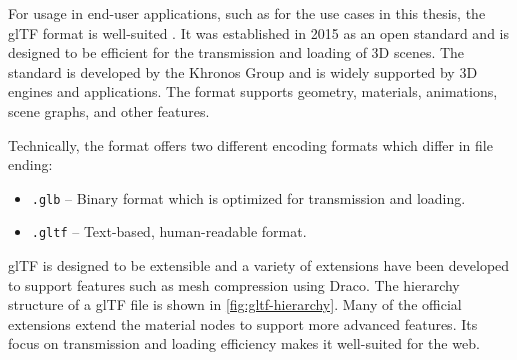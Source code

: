 For usage in end-user applications, such as for the use cases in this thesis, the \gls{glTF} format is well-suited \cite{gltfSpecification}. It was established in 2015 as an open standard and is designed to be efficient for the transmission and loading of 3D scenes. The standard is developed by the \gls{Khronos Group} and is widely supported by 3D engines and applications. The format supports geometry, materials, animations, scene graphs, and other features.

Technically, the format offers two different encoding formats which differ in file ending:

\begin{itemize}
  \item{\texttt{.glb}} – Binary format which is optimized for transmission and loading.
  \item{\texttt{.gltf}} – Text-based, human-readable format.
\end{itemize}

\gls{glTF} is designed to be extensible and a variety of extensions have been developed to support features such as mesh compression using Draco. The hierarchy structure of a \gls{glTF} file is shown in \autoref{fig:gltf-hierarchy}. Many of the official extensions extend the material nodes to support more advanced features. Its focus on transmission and loading efficiency makes it well-suited for the web.

